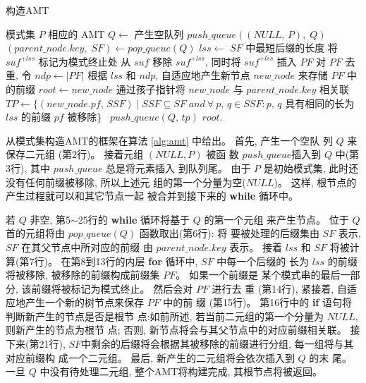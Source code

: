 \begin{algorithm}
  \caption{构造AMT}
  \label{alg:amt}
  \begin{algorithmic}[1]
    \REQUIRE 模式集 $P$
    \ENSURE  相应的 AMT
    \STATE
    \STATE $Q \leftarrow$ 产生空队列
    \STATE $push\_queue((NULL,\,P),\; Q)$
    \STATE
    \STATE $(parent\_node.key,\; SF) \leftarrow pop\_queue(Q)$
    \STATE $lss \leftarrow$ $SF$ 中最短后缀的长度
    \STATE 将 $suf^{+lss}$ 标记为模式终止处
    \ENDIF
    \STATE   从 $suf$ 移除 $suf^{+lss}$, 同时将 $suf^{+lss}$ 插入 $PF$
    \ENDFOR
    \STATE 对 $PF$ 去重, 令 $ndp \leftarrow |PF|$
    \STATE 根据 $lss$ 和 $ndp$, 自适应地产生新节点
    $new\_node$ 来存储 $PF$ 中的前缀
    \STATE $root \leftarrow new\_node$
    \ELSE
    \STATE 通过孩子指针将 $new\_node$
    与 $parent\_node.key$ 相关联
    \ENDIF
    \STATE $TP \leftarrow \{(new\_node.pf,\, SSF) \mid SSF \subseteq SF\; and
    \ \forall \ p,\,q \in SSF: p,\,q$ 具有相同的长为 $lss$ 的前缀
    $pf$ 被移除\}\
    \STATE $push\_queue(Q,\,tp)$
    \ENDFOR
    \ENDWHILE
    \STATE
    \RETURN $root$.
  \end{algorithmic}
\end{algorithm}

从模式集构造AMT的框架在算法 \ref{alg:amt} 中给出。 首先, 产生一个空队
列 $Q$ 来保存二元组 (第2行)。 接着元组 $(NULL, P)$ 被函
数 $push\_queue$插入到 $Q$ 中(第3行), 其中 $push\_queue$ 总是将元素插入
到队列尾。 由于 $P$ 是初始模式集, 此时还没有任何前缀被移除, 所以上述元
组的第一个分量为空($NULL$)。 这样, 根节点的产生过程就可以和其它节点一起
被合并到接下来的 \textbf{while} 循环中。

若 $Q$ 非空, 第5$\sim$25行的 \textbf{while} 循环将基于 $Q$ 的第一个元组
来产生节点。 位于 $Q$ 首的元组将由 $pop\_queue(Q)$ 函数取出(第6行): 将
要被处理的后缀集由 $SF$ 表示, $SF$ 在其父节点中所对应的前缀
由 $parent\_node.key$ 表示。 接着 $lss$ 和 $SF$ 将被计
算(第7行)。 在第8到13行的内层 \textbf{for} 循环中, $SF$ 中每一个后缀的
长为 $lss$ 的前缀将被移除, 被移除的前缀构成前缀集 $PF$。 如果一个前缀是
某个模式串的最后一部分, 该前缀将被标记为模式终止。 然后会对 $PF$ 进行去
重 (第14行), 紧接着, 自适应地产生一个新的树节点来保存 $PF$ 中的前
缀 (第15行)。 第16行中的 \textbf{if} 语句将判断新产生的节点是否是根节
点:如前所述, 若当前二元组的第一个分量为 $NULL$, 则新产生的节点为根节
点; 否则, 新节点将会与其父节点中的对应前缀相关联。 接下来(第21行),
$SF$中剩余的后缀将会根据其被移除的前缀进行分组, 每一组将与其对应前缀构
成一个二元组。 最后, 新产生的二元组将会依次插入到 $Q$ 的末
尾。 一旦 $Q$ 中没有待处理二元组, 整个AMT将构建完成, 其根节点将被返回。

